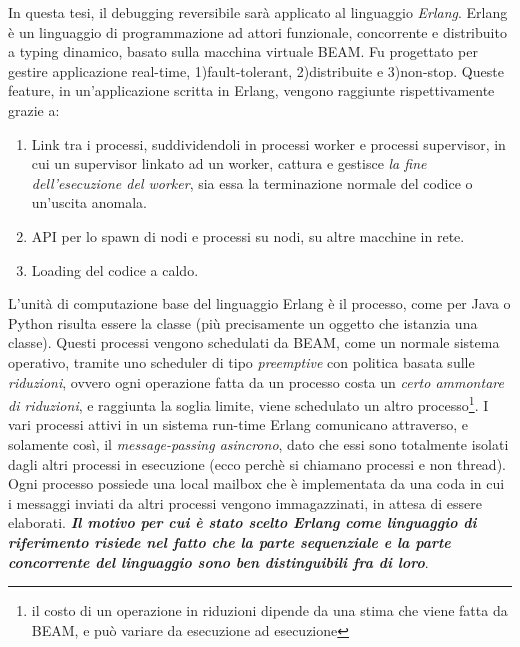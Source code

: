 \documentclass[Tesi.tex]{subfiles}
\begin{document}
In questa tesi, il debugging reversibile sarà applicato al linguaggio \textit{Erlang}\cite{erlangDoc}.
Erlang è un linguaggio di programmazione ad attori funzionale, concorrente e distribuito a typing dinamico, basato sulla macchina virtuale BEAM.
Fu progettato per gestire applicazione real-time, 1)fault-tolerant, 2)distribuite e 3)non-stop.
Queste feature, in un'applicazione scritta in Erlang, vengono raggiunte rispettivamente grazie a:
\begin{enumerate}
	\item Link tra i processi, suddividendoli in processi worker e processi supervisor, in cui un supervisor linkato ad un worker, cattura e gestisce \textit{la fine dell'esecuzione del worker}, sia essa la terminazione normale del codice o un'uscita anomala.
	\item API per lo spawn di nodi e processi su nodi, su altre macchine in rete.
	\item Loading del codice a caldo.
\end{enumerate}
L'unità di computazione base del linguaggio Erlang è il processo, come per Java o Python risulta essere 
la classe (più precisamente un oggetto che istanzia una classe).
Questi processi vengono schedulati da BEAM, come un normale sistema operativo, tramite uno scheduler di tipo \textit{preemptive} con politica basata sulle \textit{riduzioni}, ovvero ogni operazione fatta da un processo costa un \textit{certo ammontare di riduzioni}, e raggiunta la soglia limite, viene schedulato un altro processo\footnote{il costo di un operazione in riduzioni dipende da una stima che viene fatta da BEAM, e può variare da esecuzione ad esecuzione}.
I vari processi attivi in un sistema run-time Erlang comunicano attraverso, e solamente così, il \textit{message-passing asincrono}, dato che essi sono totalmente isolati dagli altri processi in esecuzione (ecco perchè si chiamano processi e non thread).
Ogni processo possiede una local mailbox che è implementata da una coda in cui i messaggi inviati da altri processi vengono immagazzinati, in attesa di essere elaborati.
\textbf{\textit{Il motivo per cui è stato scelto Erlang come linguaggio di riferimento risiede nel fatto che la parte sequenziale e la parte concorrente del linguaggio sono ben distinguibili fra di loro}}.
\end{document}
